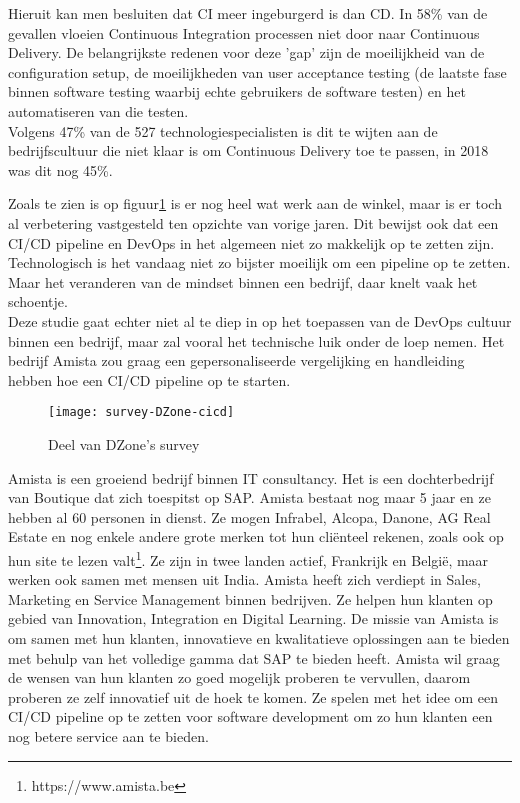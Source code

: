 Hieruit kan men besluiten dat CI meer ingeburgerd is dan CD. In 58\% van de gevallen vloeien Continuous Integration processen niet door naar Continuous Delivery. De belangrijkste redenen voor deze 'gap' zijn de moeilijkheid van de configuration setup, de moeilijkheden van user acceptance testing (de laatste fase binnen software testing waarbij echte gebruikers de software testen) en het automatiseren van die testen.\\
Volgens 47\% van de 527 technologiespecialisten is dit te wijten aan de bedrijfscultuur die niet klaar is om Continuous Delivery toe te passen, in 2018 was dit nog 45\%.

Zoals te zien is op figuur\ref{img-survey-cicd} is er nog heel wat werk aan de winkel, maar is er toch al verbetering vastgesteld ten opzichte van vorige jaren. Dit bewijst ook dat een CI/CD pipeline en DevOps in het algemeen niet zo makkelijk op te zetten zijn. Technologisch is het vandaag niet zo bijster moeilijk om een pipeline op te zetten. Maar het veranderen van de mindset binnen een bedrijf, daar knelt vaak het schoentje.\\
Deze studie gaat echter niet al te diep in op het toepassen van de DevOps cultuur binnen een bedrijf, maar zal vooral het technische luik onder de loep nemen. Het bedrijf Amista zou graag een gepersonaliseerde vergelijking en handleiding hebben hoe een CI/CD pipeline op te starten.

\begin{figure}	
    \texttt{[image: survey-DZone-cicd]}
    \caption{Deel van DZone's survey ~\autocite{Baker2019}} \label{img-survey-cicd}
\end{figure}

Amista is een groeiend bedrijf binnen IT consultancy. Het is een dochterbedrijf van Boutique dat zich toespitst op SAP. Amista bestaat nog maar 5 jaar en ze hebben al 60 personen in dienst. Ze mogen Infrabel, Alcopa, Danone, AG Real Estate en nog enkele andere grote merken tot hun cliënteel rekenen, zoals ook op hun site te lezen valt\footnote{https://www.amista.be}. %
Ze zijn in twee landen actief, Frankrijk en België, maar werken ook samen met mensen uit India.
Amista heeft zich verdiept in Sales, Marketing en Service Management binnen bedrijven. Ze helpen hun klanten op gebied van Innovation, Integration en Digital Learning.
De missie van Amista is om samen met hun klanten, innovatieve en kwalitatieve oplossingen aan te bieden met behulp van het volledige gamma dat SAP te bieden heeft.
Amista wil graag de wensen van hun klanten zo goed mogelijk proberen te vervullen, daarom proberen ze zelf innovatief uit de hoek te komen. Ze spelen met het idee om een CI/CD pipeline op te zetten voor software development om zo hun klanten een nog betere service aan te bieden.

